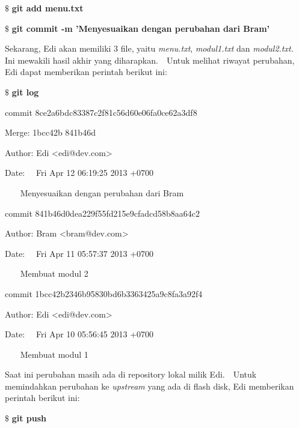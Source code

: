 \noindent 
 $  \$  $ \textbf{git add menu.txt} \par
\noindent 
 $  \$  $ \textbf{git commit -m 'Menyesuaikan dengan perubahan dari Bram'} \par
\noindent 
\vspace{12pt}
\noindent 
Sekarang, Edi akan memiliki 3 file, yaitu \textit{menu.txt}, \textit{modul1.txt} dan \textit{modul2.txt.} $  $ $  $ Ini mewakili hasil akhir yang diharapkan. $  $ $  $ Untuk melihat riwayat perubahan, Edi dapat memberikan perintah berikut ini: \par
\noindent 
 $  \$  $ \textbf{git log} \par
\noindent 
commit 8ce2a6bdc83387c2f81c56d60e06fa0ce62a3df8 \par
\noindent 
Merge: 1bcc42b 841b46d \par
\noindent 
Author: Edi <edi@dev.com> \par
\noindent 
Date:~~ Fri Apr 12 06:19:25 2013 +0700 \par
\noindent 
\vspace{12pt}
\noindent 
~~~ Menyesuaikan dengan perubahan dari Bram \par
\noindent 
\vspace{12pt}
\noindent 
commit 841b46d0dea229f55fd215e9cfadcd58b8aa64c2 \par
\noindent 
Author: Bram <bram@dev.com> \par
\noindent 
Date:~~ Fri Apr 11 05:57:37 2013 +0700 \par
\noindent 
\vspace{12pt}
\noindent 
~~~ Membuat modul 2 \par
\noindent 
\vspace{12pt}
\noindent 
commit 1bcc42b2346b95830bd6b3363425a9c8fa3a92f4 \par
\noindent 
Author: Edi <edi@dev.com> \par
\noindent 
Date:~~ Fri Apr 10 05:56:45 2013 +0700 \par
\noindent 
\vspace{12pt}
\noindent 
~~~ Membuat modul 1 \par
\noindent 
\vspace{12pt}
\noindent 
Saat ini perubahan masih ada di repository lokal milik Edi. $  $ $  $ Untuk memindahkan perubahan ke \textit{upstream} yang ada di flash disk, Edi memberikan perintah berikut ini: \par
\vspace{12pt}
\noindent 
 $  \$  $ \textbf{git push} \par
